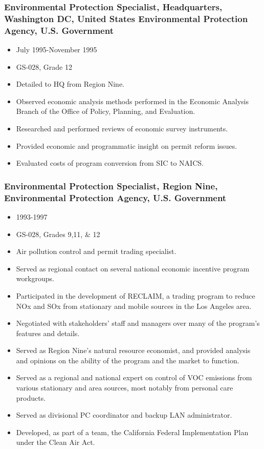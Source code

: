 \documentclass[12pt]{article}
\begin{document}
\subsubsection{Environmental Protection Specialist, Headquarters,
Washington DC, United States Environmental Protection Agency, U.S.
Government}

\begin{itemize}
\item
  July 1995-November 1995
\item
  GS-028, Grade 12
\item
  Detailed to HQ from Region Nine.
\item
  Observed economic analysis methods performed in the Economic Analysis
  Branch of the Office of Policy, Planning, and Evaluation.
\item
  Researched and performed reviews of economic survey instruments.
\item
  Provided economic and programmatic insight on permit reform issues.
\item
  Evaluated costs of program conversion from SIC to NAICS.
\end{itemize}

\subsubsection{Environmental Protection Specialist, Region Nine,
Environmental Protection Agency, U.S.
Government}

\begin{itemize}
\item
  1993-1997
\item
  GS-028, Grades 9,11, \& 12
\item
  Air pollution control and permit trading specialist.
\item
  Served as regional contact on several national economic incentive
  program workgroups.
\item
  Participated in the development of RECLAIM, a trading program to
  reduce NOx and SOx from stationary and mobile sources in the Los
  Angeles area.
\item
  Negotiated with stakeholders' staff and managers over many of the
  program's features and details.
\item
  Served as Region Nine's natural resource economist, and provided
  analysis and opinions on the ability of the program and the market to
  function.
\item
  Served as a regional and national expert on control of VOC emissions
  from various stationary and area sources, most notably from personal
  care products.
\item
  Served as divisional PC coordinator and backup LAN administrator.
\item
  Developed, as part of a team, the California Federal Implementation
  Plan under the Clean Air Act.
\end{itemize}
\end{document}
